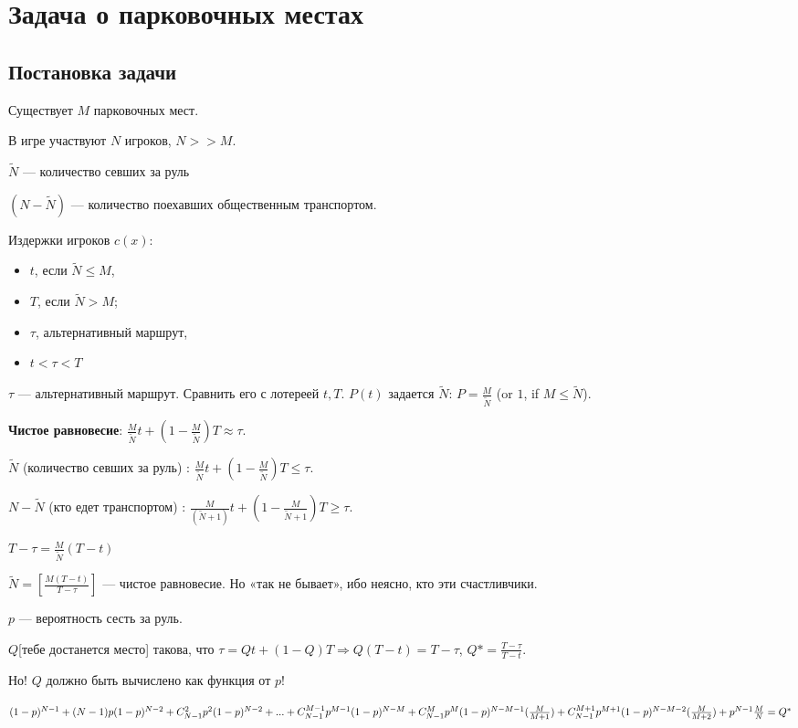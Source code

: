 \chapter{Задача о парковочных местах}

\section{Постановка задачи}

Существует $M$ парковочных мест.

В игре участвуют $N$ игроков, $N >> M$.

$\tilde N$ --- количество севших за руль

$(N - \tilde N)$ --- количество поехавших общественным транспортом.

Издержки игроков $c(x)$:
\begin{itemize}
 \item  $t$, если $\tilde N\le M$,
 \item  $T$, если $\tilde N>M$;
 \item  $\tau$, альтернативный маршрут,
 \item  $t<\tau<T$
\end{itemize}

$\tau$ — альтернативный маршрут.
Сравнить его с лотереей ${t,T}$.
$P(t)$ задается $\tilde N$: $P=\frac{M}{\tilde{N}}$ (or $1$, if $M \le \tilde N$).

\textbf{Чистое равновесие}: $\frac{M}{\tilde N}t+(1-\frac{M}{\tilde{N}})T\approx\tau$.


$\tilde{N}$ (количество севших за руль) : $\frac{M}{\tilde{N}}t+(1-\frac{M}{\tilde{N}})T\le\tau$.

${N-\tilde N}$ (кто едет транспортом) : $\frac{M}{(\tilde{N}+1)}t+(1-\frac{M}{\tilde{N}+1})T\ge\tau$.

$T-\tau = \frac{M}{\tilde{N}}(T-t)$

$\tilde{N}=[\frac{M(T-t)}{T-\tau}]$ — чистое равновесие. Но «так не бывает», ибо неясно, кто эти счастливчики.

$p$ — вероятность сесть за руль.

$Q$[тебе достанется место] такова, что $\tau = Qt+(1-Q)T \Rightarrow Q(T-t)=T-\tau$, $Q*=\frac{T-\tau}{T-t}$.

Но! $Q$ должно быть вычислено как функция от $p$!

$(1-p)^{N-1} + \\ (N-1)p(1-p)^{N-2} + \\ C_{N-1}^2 p^2(1-p)^{N-2} + ... + \\ C_{N-1}^{M-1}p^{M-1}(1-p)^{N-M} + \\ C_{N-1}^{M}p^M(1-p)^{N-M-1}(\frac{M}{M+1}) + \\ C_{N-1}^{M+1}p^{M+1}(1-p)^{N-M-2}(\frac{M}{M+2}) + \\ p^{N-1}\frac{M}{N} = \\ Q^*$

